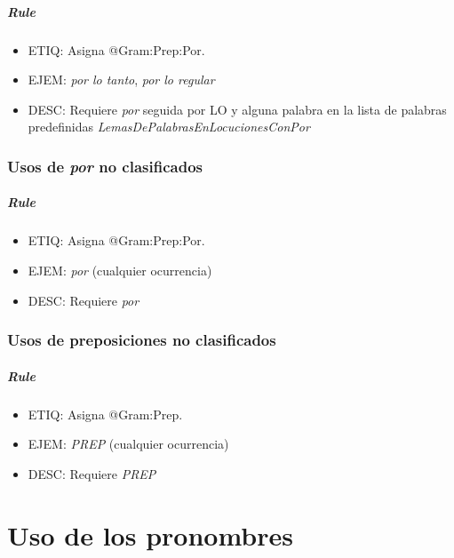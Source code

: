 \documentclass[11pt]{report}
\begin{document}
\paragraph*{Rule}
\begin{itemize}
\item ETIQ: Asigna @Gram:Prep:Por.
\item EJEM: \emph{por lo tanto}, \emph{por lo regular}
\item DESC: Requiere \emph{por} seguida por LO y alguna palabra en la lista de palabras predefinidas \emph{LemasDePalabrasEnLocucionesConPor}
\end{itemize}

\subsection{Usos de \emph{por} no clasificados}
\paragraph*{Rule}
\begin{itemize}
\item ETIQ: Asigna @Gram:Prep:Por.
\item EJEM: \emph{por} (cualquier ocurrencia)
\item DESC: Requiere \emph{por}
\end{itemize}

\subsection{Usos de preposiciones no clasificados}
\paragraph*{Rule}
\begin{itemize}
\item ETIQ: Asigna @Gram:Prep.
\item EJEM: \emph{PREP} (cualquier ocurrencia)
\item DESC: Requiere \emph{PREP}
\end{itemize}

\chapter{Uso de los pronombres}
\end{document}
